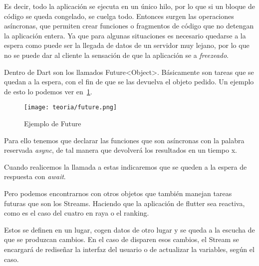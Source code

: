 Es decir, todo la aplicación se ejecuta en un único hilo, por lo que si un bloque de código se queda congelado, se cuelga todo. Entonces surgen las operaciones asíncronas, que permiten crear funciones o fragmentos de código que no detengan la aplicación entera. Ya que para algunas situaciones es necesario quedarse a la espera como puede ser la llegada de datos de un servidor muy lejano, por lo que no se puede dar al cliente la sensación de que la aplicación se a \emph{freezeado}.

Dentro de Dart son los llamados Future<Object>. Básicamente son tareas que se quedan a la espera, con el fin de que se las devuelva el objeto pedido. Un ejemplo de esto lo podemos ver en~\ref{fig:future}.

\begin{figure}[H]
	\centering
	\texttt{[image: teoria/future.png]}
	\caption{Ejemplo de Future}\label{fig:future}
\end{figure}

Para ello tenemos que declarar las funciones que son asíncronas con la palabra reservada \emph{async}, de tal manera que devolverá los resultados en un tiempo x.

Cuando realicemos la llamada a estas indicaremos que se queden a la espera de respuesta con \emph{await}.

Pero podemos encontrarnos con otros objetos que también manejan tareas futuras que son los Streams. Haciendo que la aplicación de flutter sea reactiva, como es el caso del cuatro en raya o el ranking.

Estos se definen en un lugar, cogen datos de otro lugar y se queda a la escucha de que se produzcan cambios. En el caso de disparen esos cambios, el Stream se encargará de rediseñar la interfaz del usuario o de actualizar la variables, según el caso.

%

